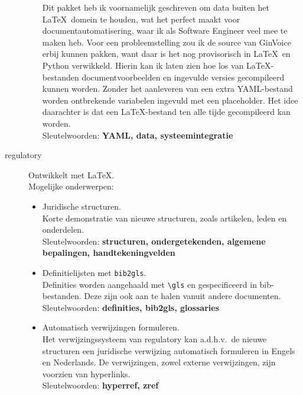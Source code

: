 \documentclass[11pt]{article}
\begin{document}
\begin{description}
\begin{itemize}
            {
                \footnotesize
                Dit pakket heb ik voornamelijk geschreven om data buiten het \LaTeX\ domein te houden, wat het perfect maakt voor documentautomatisering, waar ik als Software Engineer veel mee te maken heb.
                Voor een probleemstelling zou ik de source van GinVoice erbij kunnen pakken, want daar is het nog provisorisch in \LaTeX\ en Python verwikkeld.
                Hierin kan ik laten zien hoe los van \LaTeX-bestanden documentvoorbeelden en ingevulde versies gecompileerd kunnen worden.
                Zonder het aanleveren van een extra YAML-bestand worden ontbrekende variabelen ingevuld met een placeholder.
                Het idee daarachter is dat een \LaTeX-bestand ten alle tijde gecompileerd kan worden.\\
                Sleutelwoorden: \textbf{YAML, data, systeemintegratie}
            }
        \end{itemize}
        \item[regulatory] Ontwikkelt met \LaTeX{}.\\
        Mogelijke onderwerpen:
        \begin{itemize}
            \item Juridische structuren.\\
            {
                \footnotesize Korte demonstratie van nieuwe structuren, zoals artikelen, leden en onderdelen.\\
                Sleutelwoorden: \textbf{structuren, ondergetekenden, algemene bepalingen, handtekeningvelden}
            }
            \item Definitielijsten met \texttt{bib2gls}.\\
            {
                \footnotesize Definities worden aangehaald met \verb|\gls| en gespecificeerd in bib-bestanden.
                Deze zijn ook aan te halen vanuit andere documenten.\\
                Sleutelwoorden: \textbf{definities, bib2gls, glossaries}
            }
            \item Automatisch verwijzingen formuleren.\\
            {
                \footnotesize Het verwijzingssysteem van regulatory kan a.d.h.v.\ de nieuwe structuren een juridische verwijzing automatisch formuleren in Engels en Nederlands.
                De verwijzingen, zowel externe verwijzingen, zijn voorzien van hyperlinks.\\
                Sleutelwoorden: \textbf{hyperref, zref}
            }

\end{itemize}
\end{description}
\end{document}
